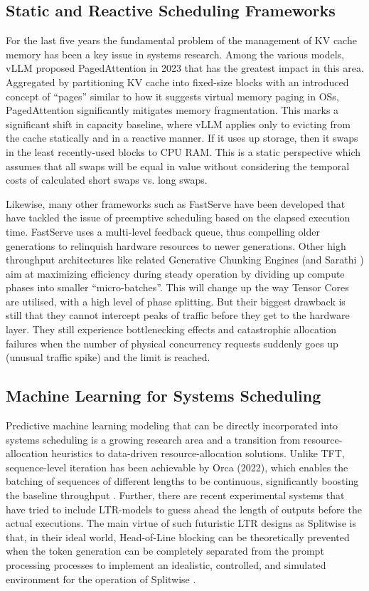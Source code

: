 \documentclass[conference]{IEEEtran}
\begin{document}
\subsection{Static and Reactive Scheduling Frameworks}
For the last five years the fundamental problem of the management of KV cache memory has been a key issue in systems research. Among the various models, vLLM \cite{b1} proposed PagedAttention in 2023 that has the greatest impact in this area. Aggregated by partitioning KV cache into fixed-size blocks with an introduced concept of “pages” similar to how it suggests virtual memory paging in OSs, PagedAttention significantly mitigates memory fragmentation. This marks a significant shift in capacity baseline, where vLLM applies only to evicting from the cache statically and in a reactive manner. If it uses up storage, then it swaps in the least recently-used blocks to CPU RAM. This is a static perspective which assumes that all swaps will be equal in value without considering the temporal costs of calculated short swaps vs. long swaps. 

Likewise, many other frameworks such as FastServe \cite{b5} have been developed that have tackled the issue of preemptive scheduling based on the elapsed execution time. FastServe uses a multi-level feedback queue, thus compelling older generations to relinquish hardware resources to newer generations. Other high throughput architectures like related Generative Chunking Engines \cite{b6} (and Sarathi \cite{b10}) aim at maximizing efficiency during steady operation by dividing up compute phases into smaller “micro-batches”. This will change up the way Tensor Cores are utilised, with a high level of phase splitting. But their biggest drawback is still that they cannot intercept peaks of traffic before they get to the hardware layer. They still experience bottlenecking effects and catastrophic allocation failures when the number of physical concurrency requests suddenly goes up (unusual traffic spike) and the limit is reached.

\subsection{Machine Learning for Systems Scheduling}
Predictive machine learning modeling that can be directly incorporated into systems scheduling is a growing research area and a transition from resource-allocation heuristics to data-driven resource-allocation solutions. Unlike TFT, sequence-level iteration has been achievable by Orca (2022), which enables the batching of sequences of different lengths to be continuous, significantly boosting the baseline throughput \cite{b4}. Further, there are recent experimental systems that have tried to include LTR-models to guess ahead the length of outputs before the actual executions. The main virtue of such futuristic LTR designs as Splitwise \cite{b9} is that, in their ideal world, Head-of-Line blocking can be theoretically prevented when the token generation can be completely separated from the prompt processing processes to implement an idealistic, controlled, and simulated environment for the operation of Splitwise \cite{b9}.
\end{document}
